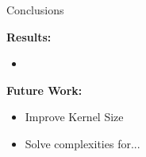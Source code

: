 
\begin{frame}{Conclusions}

    \textbf{Results: }
    \begin{itemize}
        \item 
    \end{itemize}


    \textbf{Future Work: }
    \begin{itemize}
        \item Improve Kernel Size
        \item Solve complexities for... 
    \end{itemize}
\end{frame}